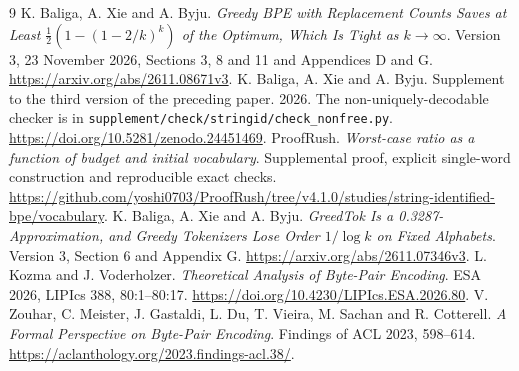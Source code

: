 \documentclass[11pt]{article}
\begin{document}
\begin{thebibliography}{9}
 K. Baliga, A. Xie and A. Byju. \emph{Greedy BPE with Replacement Counts Saves at Least $\frac12(1-(1-2/k)^k)$ of the Optimum, Which Is Tight as $k\to\infty$}. Version 3, 23 November 2026, Sections 3, 8 and 11 and Appendices D and G. \url{https://arxiv.org/abs/2611.08671v3}.
 K. Baliga, A. Xie and A. Byju. Supplement to the third version of the preceding paper. 2026. The non-uniquely-decodable checker is in \texttt{supplement/check/stringid/check\_nonfree.py}. \url{https://doi.org/10.5281/zenodo.24451469}.
 ProofRush. \emph{Worst-case ratio as a function of budget and initial vocabulary}. Supplemental proof, explicit single-word construction and reproducible exact checks. \url{https://github.com/yoshi0703/ProofRush/tree/v4.1.0/studies/string-identified-bpe/vocabulary}.
 K. Baliga, A. Xie and A. Byju. \emph{GreedTok Is a 0.3287-Approximation, and Greedy Tokenizers Lose Order $1/\log k$ on Fixed Alphabets}. Version 3, Section 6 and Appendix G. \url{https://arxiv.org/abs/2611.07346v3}.
 L. Kozma and J. Voderholzer. \emph{Theoretical Analysis of Byte-Pair Encoding}. ESA 2026, LIPIcs 388, 80:1--80:17. \url{https://doi.org/10.4230/LIPIcs.ESA.2026.80}.
 V. Zouhar, C. Meister, J. Gastaldi, L. Du, T. Vieira, M. Sachan and R. Cotterell. \emph{A Formal Perspective on Byte-Pair Encoding}. Findings of ACL 2023, 598--614. \url{https://aclanthology.org/2023.findings-acl.38/}.
\end{thebibliography}
\end{document}

